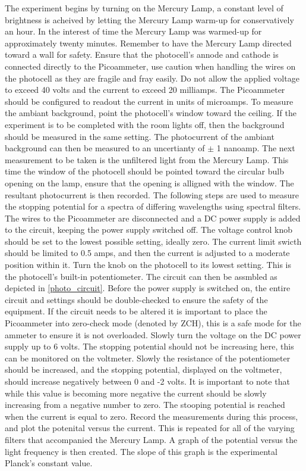 \documentclass[a4paper]{article}
\begin{document}

\qq The experiment begins by turning on the Mercury Lamp, a constant
level of brightness is acheived by letting the Mercury Lamp warm-up
for conservatively an hour. In the interest of time the Mercury Lamp
was warmed-up for approximately twenty minutes. Remember to have the
Mercury Lamp directed toward a wall for safety. Ensure that the
photocell's annode and cathode is connected directly to the
Picoammeter, use caution when handling the wires on the photocell as
they are fragile and fray easily. Do not allow the applied voltage to
exceed 40 volts and the current to exceed 20 milliamps. The
Picoammeter should be configured to readout the current in units of
microamps. To measure the ambiant background, point the photocell's
window toward the ceiling. If the experiment is to be completed with
the room lights off, then the background should be measured in the
same setting. The photocurrent of the ambiant background can then be
measured to an uncertianty of $\pm$ 1 nanoamp. The next measurement to
be taken is the unfiltered light from the Mercury Lamp. This time the
window of the photocell should be pointed toward the circular bulb
opening on the lamp, ensure that the opening is alligned with the
window. The resultant photocurrent is then recorded. The following
steps are used to measure the stopping potential for a spectra of
differing wavelengths using spectral filters. The wires to the
Picoammeter are disconnected and a DC power supply is added to the
circuit, keeping the power supply switched off. The voltage control
knob should be set to the lowest possible setting, ideally zero. The
current limit swicth should be limited to 0.5 amps, and then the
current is adjusted to a moderate position within it. Turn the knob on
the photocell to its lowest setting. This is the photocell's built-in
potentiometer. The circuit can then be assmbled as depicted in
\ref{photo_circuit}. Before the power supply is switched on, the
entire circuit and settings should be double-checked to ensure the
safety of the equipment. If the circuit needs to be altered it is
important to place the Picoammeter into zero-check mode (denoted by
ZCH), this is a safe mode for the ammeter to ensure it is not
overloaded. Slowly turn the voltage on the DC power supply up to 6
volts. The stopping potential should not be increasing here, this can
be monitored on the voltmeter. Slowly the resistance of the
potentiometer should be increased, and the stopping potential,
displayed on the voltmeter, should increase negatively between 0 and
-2 volts. It is important to note that while this value is becoming
more negative the current should be slowly increasing from a negative
number to zero. The stooping potential is reached when the current is
equal to zero. Record the measurements during this process, and plot
the potenital versus the current. This is repeated for all of the
varying filters that accompanied the Mercury Lamp. A graph of the
potential versus the light frequency is then created. The slope of
this graph is the experimental Planck's constant value.
\end{document}
